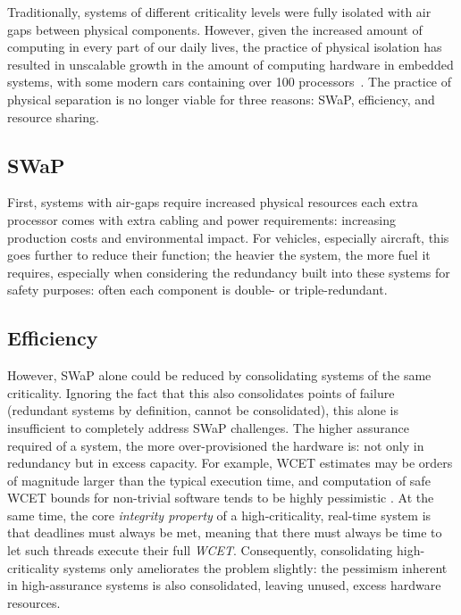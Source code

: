 Traditionally, systems of different criticality levels were fully isolated with
air gaps between physical components. However, given the increased amount of
computing in every part of our daily lives, the practice of physical isolation
has resulted in unscalable growth in the amount of computing hardware in
embedded systems, with some modern cars containing over 100
processors~\citep{Hergenhan_Heiser_08}. The practice of physical separation is no 
longer viable for three reasons: \gls{SWaP}, efficiency, and resource sharing.

\subsection{SWaP}

First, systems with air-gaps require increased physical
resources each extra processor comes with extra cabling and power requirements:
increasing production costs and environmental impact.
For vehicles, especially aircraft, this goes further to reduce their function; the
heavier the system, the more fuel it requires, especially when considering 
the redundancy built into these systems for safety purposes: often each component is double- or
triple-redundant. 

\subsection{Efficiency} 

However, \gls{SWaP} alone could be reduced by consolidating systems of the same
criticality. Ignoring the fact that this also consolidates points of failure (redundant systems by
definition, cannot be consolidated), this alone is insufficient to completely address \gls{SWaP}
challenges. The higher assurance required of a system, the more over-provisioned the hardware is: not only in
redundancy but in excess capacity. For example, \gls{WCET}
estimates may be orders of magnitude larger than the typical execution time, and
computation of safe \gls{WCET} bounds for non-trivial software tends to be highly pessimistic
\citep{Wilhelm_EEHTWBFHMMPPSS_08}. At the same time, the core \emph{integrity property} of a
high-criticality, real-time system is that deadlines must always be
met, meaning that there must always be time to let such threads execute their full \emph{\gls{WCET}}.
Consequently, consolidating high-criticality
systems only ameliorates the problem slightly: the pessimism inherent in high-assurance systems is
also consolidated, leaving unused, excess hardware resources.

